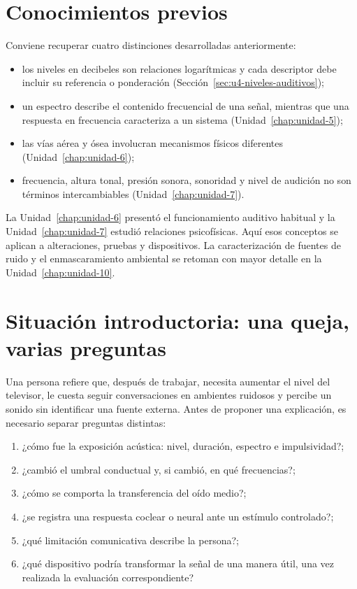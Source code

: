 \section{Conocimientos previos}
\label{sec:u8-previos}

Conviene recuperar cuatro distinciones desarrolladas anteriormente:

\begin{itemize}
    \item los niveles en decibeles son relaciones logarítmicas y cada
    descriptor debe incluir su referencia o ponderación
    (Sección~\ref{sec:u4-niveles-auditivos});
    \item un espectro describe el contenido frecuencial de una señal, mientras
    que una respuesta en frecuencia caracteriza a un sistema
    (Unidad~\ref{chap:unidad-5});
    \item las vías aérea y ósea involucran mecanismos físicos diferentes
    (Unidad~\ref{chap:unidad-6});
    \item frecuencia, altura tonal, presión sonora, sonoridad y nivel de
    audición no son términos intercambiables
    (Unidad~\ref{chap:unidad-7}).
\end{itemize}

La Unidad~\ref{chap:unidad-6} presentó el funcionamiento auditivo habitual y
la Unidad~\ref{chap:unidad-7} estudió relaciones psicofísicas. Aquí esos
conceptos se aplican a
alteraciones, pruebas y dispositivos. La caracterización de fuentes de ruido
y el enmascaramiento ambiental se retoman con mayor detalle en la
Unidad~\ref{chap:unidad-10}.

\section{Situación introductoria: una queja, varias preguntas}
\label{sec:u8-situacion}

Una persona refiere que, después de trabajar, necesita aumentar el nivel del
televisor, le cuesta seguir conversaciones en ambientes ruidosos y percibe un
sonido sin identificar una fuente externa. Antes de proponer una explicación,
es necesario separar preguntas distintas:

\begin{enumerate}
    \item ¿cómo fue la exposición acústica: nivel, duración, espectro e
    impulsividad?;
    \item ¿cambió el umbral conductual y, si cambió, en qué frecuencias?;
    \item ¿cómo se comporta la transferencia del oído medio?;
    \item ¿se registra una respuesta coclear o neural ante un estímulo
    controlado?;
    \item ¿qué limitación comunicativa describe la persona?;
    \item ¿qué dispositivo podría transformar la señal de una manera útil,
    una vez realizada la evaluación correspondiente?
\end{enumerate}

